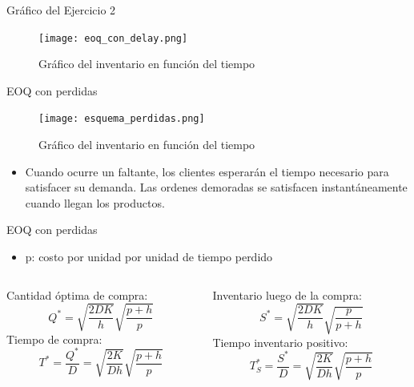 \documentclass{beamer}
\begin{document}
\begin{frame}{Gráfico del Ejercicio 2}
    \begin{figure}
        \centering
        \texttt{[image: eoq\_con\_delay.png]}
        \caption{Gráfico del inventario en función del tiempo}
    \end{figure}
\end{frame}

\begin{frame}{EOQ con perdidas}
    \begin{figure}
        \centering
        \texttt{[image: esquema\_perdidas.png]}
        \caption{Gráfico del inventario en función del tiempo}
    \end{figure}

\begin{itemize}
    \item Cuando ocurre un faltante, los clientes esperarán el tiempo necesario para satisfacer su demanda. Las ordenes demoradas se satisfacen instantáneamente cuando llegan los productos.
\end{itemize} 
\end{frame}

\begin{frame}{EOQ con perdidas}
\begin{itemize}
    \item \textcolor{primary}{p}: costo por unidad por unidad de tiempo perdido
\end{itemize}
    \begin{columns}[T]
        \begin{column}{0.5\textwidth}
            \textcolor{primary}{Cantidad óptima de compra:}
            \[ Q^* = \sqrt{\frac{2DK}{h}}\sqrt{\frac{p+h}{p}} \]
            \vspace{0.5cm}
            \textcolor{primary}{Tiempo de compra:}
            \[T^* = \frac{Q^*}{D}=\sqrt{\frac{2K}{Dh}}\sqrt{\frac{p + h}{p}}\]
        \end{column}
        \begin{column}{0.5\textwidth}
            \textcolor{primary}{Inventario luego de la compra:}
            \[ S^* = \sqrt{\frac{2DK}{h}}\sqrt{\frac{p}{p+h}} \]
            \vspace{0.5cm}
            \textcolor{primary}{Tiempo inventario positivo:}
            \[T_S^* = \frac{S^*}{D} = \sqrt{\frac{2K}{Dh}}\sqrt{\frac{p+h}{p}}\]
        \end{column}
    \end{columns}
\end{frame}
\end{document}
